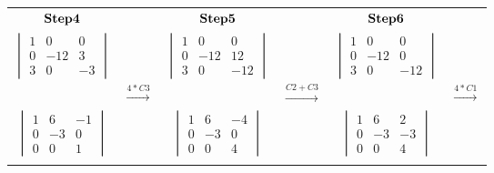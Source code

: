 \documentclass[]{article}
\begin{document}
\begin{tabular}{ c c c c c c }
$\bold{Step 4}$ &  & $\bold{Step 5}$  &  & $\bold{Step 6}$ \\
$\begin{vmatrix} 1 & 0 & 0\\ 0 & -12 & 3 \\ 3 & 0 & -3 \end{vmatrix}$ &  & $\begin{vmatrix} 1 & 0 & 0\\ 0 & -12 & 12 \\ 3 & 0 & -12 \end{vmatrix}$ &  & $\begin{vmatrix} 1 & 0 & 0\\ 0 & -12 & 0 \\ 3 & 0 & -12 \end{vmatrix}$ \\  
 & $\xrightarrow{4*C3}$ &  & $\xrightarrow{C2+C3}$ & & $\xrightarrow{4*C1}$\\
$\begin{vmatrix} 1 &   6 &   -1\\ 0 &   -3 &  0 \\ 0 &   0 &   1 \end{vmatrix}$ &  & $\begin{vmatrix} 1 &   6 &   -4\\ 0 &   -3 &   0 \\ 0 &   0 &   4 \end{vmatrix}$ &  & $\begin{vmatrix} 1 &   6 &   2\\ 0 &   -3 &   -3\\ 0 &   0 &   4 \end{vmatrix}$\\
 &  &  \\
\end{tabular}

\endgroup

\hspace{3cm}

\begingroup
\end{document}
